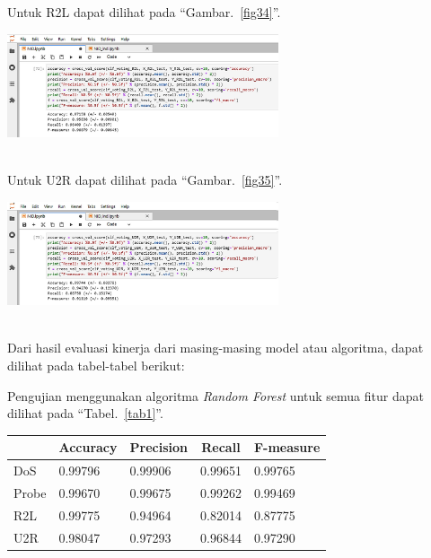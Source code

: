 \documentclass[conference]{IEEEtran}
\begin{document}
\noindent Untuk R2L dapat dilihat pada ``Gambar.~\ref{fig34}''.\\

\begin{minipage}{\linewidth}
\centerline{\includegraphics[width=80mm]{Gambar/Gbr33.jpg}}
\label{fig34}
\end{minipage}\\

\noindent Untuk U2R dapat dilihat pada ``Gambar.~\ref{fig35}''.\\

\begin{minipage}{\linewidth}
\centerline{\includegraphics[width=80mm]{Gambar/Gbr34.jpg}}
\label{fig35}
\end{minipage}\\

Dari hasil evaluasi kinerja dari masing-masing model atau algoritma, dapat dilihat pada tabel-tabel berikut:

\noindent Pengujian menggunakan algoritma \emph{Random Forest} untuk semua fitur dapat dilihat pada ``Tabel.~\ref{tab1}''.\\

\begin{minipage}{\linewidth}
\begin{center}
\begin{tabular}{|l|l|l|l|l|}
\hline
\multicolumn{1}{|c|}{\textbf{}}&\multicolumn{1}{|c|}{\textbf{Accuracy}}&\multicolumn{1}{|c|}{\textbf{Precision}}&\multicolumn{1}{|c|}{\textbf{Recall}}&\multicolumn{1}{|c|}{\textbf{F-measure}} \\
\hline
DoS & 0.99796 & 0.99906 & 0.99651 & 0.99765\\
\hline
Probe & 0.99670 & 0.99675 & 0.99262 & 0.99469\\
\hline
R2L & 0.99775 & 0.94964 & 0.82014 & 0.87775\\
\hline
U2R & 0.98047 & 0.97293 & 0.96844 & 0.97290\\
\hline
\end{tabular}
\label{tab1}
\end{center}
\end{minipage}\\ \\
\end{document}
